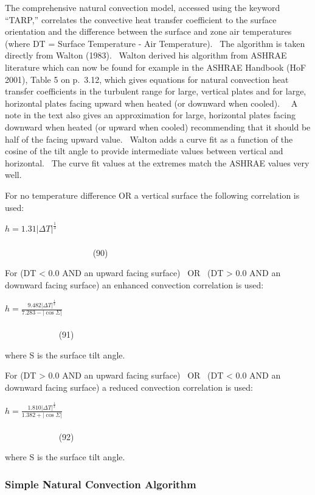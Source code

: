 The comprehensive natural convection model, accessed using the keyword ``TARP,'' correlates the convective heat transfer coefficient to the surface orientation and the difference between the surface and zone air temperatures (where DT = Surface Temperature - Air Temperature).~ The algorithm is taken directly from Walton (1983).~ Walton derived his algorithm from ASHRAE literature which can now be found for example in the ASHRAE Handbook (HoF 2001), Table 5 on p.~3.12, which gives equations for natural convection heat transfer coefficients in the turbulent range for large, vertical plates and for large, horizontal plates facing upward when heated (or downward when cooled).~~ A note in the text also gives an approximation for large, horizontal plates facing downward when heated (or upward when cooled) recommending that it should be half of the facing upward value.~ Walton adds a curve fit as a function of the cosine of the tilt angle to provide intermediate values between vertical and horizontal.~ The curve fit values at the extremes match the ASHRAE values very well.

For no temperature difference OR a vertical surface the following correlation is used:

\(h = 1.31{\left| {\Delta T} \right|^{\frac{1}{3}}}\) ~~~~~~~~~~~~~~~~~~~~~~~~~~~~~~~~~~~~~~~~~~~~~~~~~~~~~~~~~~~~~~~~~~~~~~~~~~~~~~~~~~~~~~~~~~~~ (90)

For (DT \textless{} 0.0 AND an upward facing surface)~ OR~ (DT \textgreater{} 0.0 AND an downward facing surface) an enhanced convection correlation is used:

\(h = \frac{{9.482{{\left| {\Delta T} \right|}^{\frac{1}{3}}}}}{{7.283 - \left| {\cos \Sigma } \right|}}\) ~~~~~~~~~~~~~~~~~~~~~~~~~~~~~~~~~~~~~~~~~~~~~~~~~~~~~~~~~~~~~~~~~~~~~~~~~~~~~~~~~~~~ (91)

where S is the surface tilt angle.

For (DT \textgreater{} 0.0 AND an upward facing surface)~ OR~ (DT \textless{} 0.0 AND an downward facing surface) a reduced convection correlation is used:

\(h = \frac{{1.810{{\left| {\Delta T} \right|}^{\frac{1}{3}}}}}{{1.382 + \left| {\cos \Sigma } \right|}}\) ~~~~~~~~~~~~~~~~~~~~~~~~~~~~~~~~~~~~~~~~~~~~~~~~~~~~~~~~~~~~~~~~~~~~~~~~~~~~~~~~~~~~ (92)

where S is the surface tilt angle.

\subsubsection{Simple Natural Convection Algorithm}\label{simple-natural-convection-algorithm}

